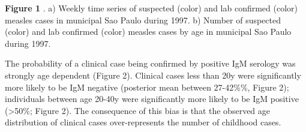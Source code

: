 \textbf{Figure 1} . a) Weekly time series of suspected (color) and lab
confirmed (color) measles cases in municipal Sao Paulo during 1997. b)
Number of suspected (color) and lab confirmed (color) measles cases by
age in municipal Sao Paulo during 1997.

The probability of a clinical case being confirmed by positive IgM
serology was strongly age dependent (Figure 2). Clinical cases less than
20y were significantly more likely to be IgM negative (posterior mean
between 27-42\%\%, Figure 2); individuals between age 20-40y were
significantly more likely to be IgM positive (\textgreater{}50\%; Figure
2). The consequence of this bias is that the observed age distribution
of clinical cases over-represents the number of childhood cases.